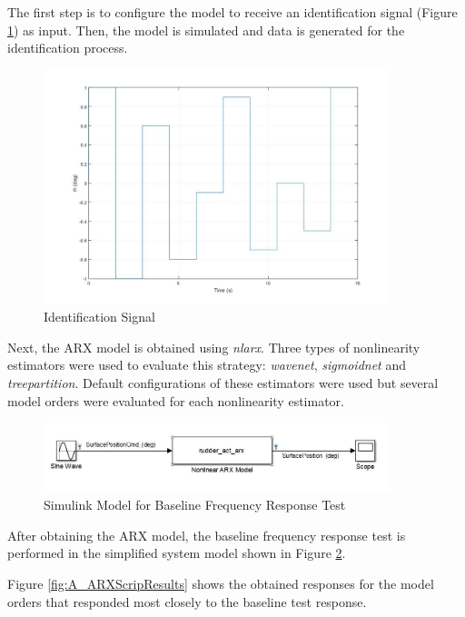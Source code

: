 The first step is to configure the model to receive an identification signal (Figure \ref{fig:A_IdentificationSignalInput}) as input. Then, the model is simulated and data is generated for the identification process. 

\begin{figure}[H]
	\centering
	\centerline{\includegraphics[width=0.9\textwidth]{Figuras/A.FrequencyResponseTest/A-IdentificationInput.jpg}}
	\caption{Identification Signal}
	\label{fig:A_IdentificationSignalInput}
\end{figure}

Next, the ARX model is obtained using \textit{nlarx}. Three types of nonlinearity estimators were used to evaluate this strategy: \textit{wavenet}, \textit{sigmoidnet} and \textit{treepartition}. Default configurations of these estimators were used but several model orders were evaluated for each nonlinearity estimator. 

\begin{figure}[H]
	\centering
	\centerline{\includegraphics[width=0.9\textwidth]{Figuras/A.FrequencyResponseTest/A-SimplifiedModel.jpg}}
	\caption{Simulink Model for Baseline Frequency Response Test}
	\label{fig:A_SimplifiedModel}
\end{figure}

After obtaining the ARX model, the baseline frequency response test is performed in the simplified system model shown in Figure \ref{fig:A_SimplifiedModel}. 

Figure \ref{fig:A_ARXScripResults} shows the obtained responses for the model orders that responded most closely to the baseline test response.

